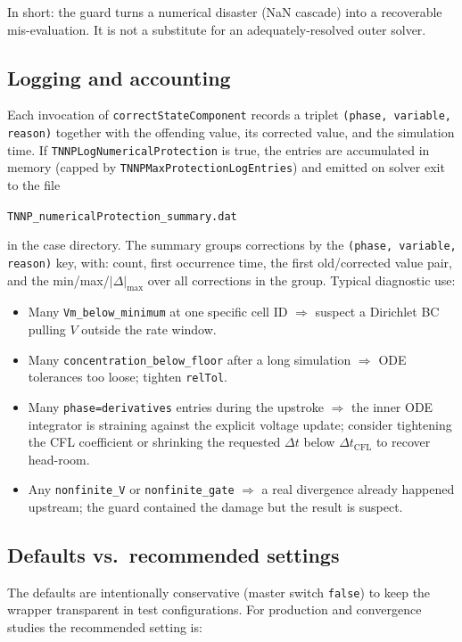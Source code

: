 \documentclass[11pt,a4paper]{article}
\newcommand{\code}[1]{\texttt{\small #1}}
\begin{document}
In short: the guard turns a numerical disaster (NaN cascade) into a
recoverable mis-evaluation. It is not a substitute for an
adequately-resolved outer solver.

\subsection{Logging and accounting}
\label{sec:tnnp:log}

Each invocation of \code{correctStateComponent} records a triplet
\code{(phase, variable, reason)} together with the offending value,
its corrected value, and the simulation time. If
\code{TNNPLogNumericalProtection} is true, the entries are
accumulated in memory (capped by \code{TNNPMaxProtectionLogEntries})
and emitted on solver exit to the file

\smallskip
\code{TNNP\_numericalProtection\_summary.dat}
\smallskip

\noindent in the case directory. The summary groups corrections by
the \code{(phase, variable, reason)} key, with: count, first
occurrence time, the first old/corrected value pair, and the
min/max/$|\Delta|_{\max}$ over all corrections in the group. Typical
diagnostic use:

\begin{itemize}[leftmargin=*]
\item Many \code{Vm\_below\_minimum} at one specific cell ID
$\Rightarrow$ suspect a Dirichlet BC pulling $V$ outside the rate
window.
\item Many \code{concentration\_below\_floor} after a long simulation
$\Rightarrow$ ODE tolerances too loose; tighten \code{relTol}.
\item Many \code{phase=derivatives} entries during the upstroke
$\Rightarrow$ the inner ODE integrator is straining against the
explicit voltage update; consider tightening the CFL coefficient or
shrinking the requested $\Delta t$ below
$\Delta t_{\text{CFL}}$ to recover head-room.
\item Any \code{nonfinite\_V} or \code{nonfinite\_gate}
$\Rightarrow$ a real divergence already happened upstream; the guard
contained the damage but the result is suspect.
\end{itemize}

\subsection{Defaults vs.\ recommended settings}
\label{sec:tnnp:settings}

The defaults are intentionally conservative (master switch
\code{false}) to keep the wrapper transparent in test configurations.
For production and convergence studies the recommended setting is:
\end{document}
